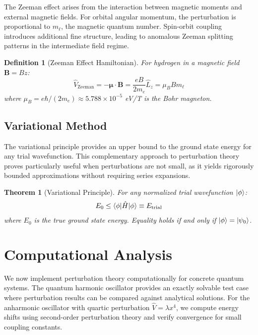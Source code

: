 \documentclass[a4paper, 11pt]{article}
\newtheorem{definition}{Definition}[section]
\newtheorem{theorem}{Theorem}[section]
\begin{document}
The Zeeman effect arises from the interaction between magnetic moments and
external magnetic fields. For orbital angular momentum, the perturbation is
proportional to $m_\ell$, the magnetic quantum number. Spin-orbit coupling
introduces additional fine structure, leading to anomalous Zeeman splitting
patterns in the intermediate field regime.

\begin{definition}[Zeeman Effect Hamiltonian]
For hydrogen in a magnetic field $\mathbf{B} = B \hat{z}$:
\begin{equation}
\hat{V}_{\text{Zeeman}} = -\boldsymbol{\mu} \cdot \mathbf{B} = \frac{e B}{2m_e} \hat{L}_z = \mu_B B m_\ell
\end{equation}
where $\mu_B = e\hbar/(2m_e) \approx 5.788 \times 10^{-5}$ eV/T is the Bohr magneton.
\end{definition}

\subsection{Variational Method}

The variational principle provides an upper bound to the ground state energy
for any trial wavefunction. This complementary approach to perturbation theory
proves particularly useful when perturbations are not small, as it yields
rigorously bounded approximations without requiring series expansions.

\begin{theorem}[Variational Principle]
For any normalized trial wavefunction $\ket{\phi}$:
\begin{equation}
E_0 \leq \braket{\phi | \hat{H} | \phi} \equiv E_{\text{trial}}
\end{equation}
where $E_0$ is the true ground state energy. Equality holds if and only if
$\ket{\phi} = \ket{\psi_0}$.
\end{theorem}

\section{Computational Analysis}

We now implement perturbation theory computationally for concrete quantum
systems. The quantum harmonic oscillator provides an exactly solvable test
case where perturbation results can be compared against analytical solutions.
For the anharmonic oscillator with quartic perturbation $\hat{V} = \lambda x^4$,
we compute energy shifts using second-order perturbation theory and verify
convergence for small coupling constants.
\end{document}
